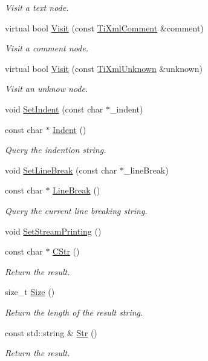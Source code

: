 \begin{DoxyCompactItemize}
\begin{DoxyCompactList}\small\item\em Visit a text node. \end{DoxyCompactList}\item 
virtual bool \hyperlink{class_ti_xml_printer_a9870423f5603630e6142f6bdb66dfb57}{Visit} (const \hyperlink{class_ti_xml_comment}{Ti\-Xml\-Comment} \&comment)
\begin{DoxyCompactList}\small\item\em Visit a comment node. \end{DoxyCompactList}\item 
virtual bool \hyperlink{class_ti_xml_printer_a08591a15c9a07afa83c24e08b03d6358}{Visit} (const \hyperlink{class_ti_xml_unknown}{Ti\-Xml\-Unknown} \&unknown)
\begin{DoxyCompactList}\small\item\em Visit an unknow node. \end{DoxyCompactList}\item 
void \hyperlink{class_ti_xml_printer_a213377a4070c7e625bae59716b089e5e}{Set\-Indent} (const char $\ast$\-\_\-indent)
\item 
const char $\ast$ \hyperlink{class_ti_xml_printer_abb33ec7d4bad6aaeb57f4304394b133d}{Indent} ()
\begin{DoxyCompactList}\small\item\em Query the indention string. \end{DoxyCompactList}\item 
void \hyperlink{class_ti_xml_printer_a4be1e37e69e3858c59635aa947174fe6}{Set\-Line\-Break} (const char $\ast$\-\_\-line\-Break)
\item 
const char $\ast$ \hyperlink{class_ti_xml_printer_a11f1b4804a460b175ec244eb5724d96d}{Line\-Break} ()
\begin{DoxyCompactList}\small\item\em Query the current line breaking string. \end{DoxyCompactList}\item 
void \hyperlink{class_ti_xml_printer_ab23a90629e374cb1cadca090468bbd19}{Set\-Stream\-Printing} ()
\item 
const char $\ast$ \hyperlink{class_ti_xml_printer_a859eede9597d3e0355b77757be48735e}{C\-Str} ()
\begin{DoxyCompactList}\small\item\em Return the result. \end{DoxyCompactList}\item 
size\-\_\-t \hyperlink{class_ti_xml_printer_ad01375ae9199bd2f48252eaddce3039d}{Size} ()
\begin{DoxyCompactList}\small\item\em Return the length of the result string. \end{DoxyCompactList}\item 
const std\-::string \& \hyperlink{class_ti_xml_printer_a3bd4daf44309b41f5813a833caa0d1c9}{Str} ()
\begin{DoxyCompactList}\small\item\em Return the result. \end{DoxyCompactList}\end{DoxyCompactItemize}


